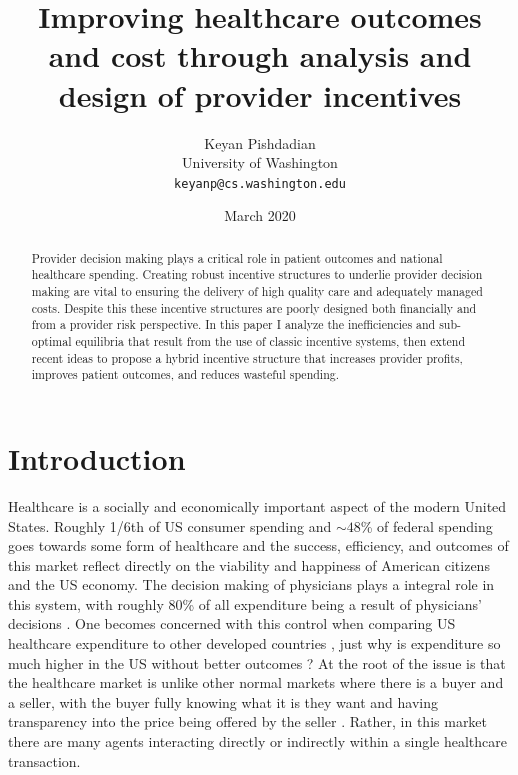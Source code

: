 \documentclass{article}
\begin{document}
\title{Improving healthcare outcomes and cost through analysis and design of provider incentives}
\author{Keyan Pishdadian\\University of Washington\\\texttt{keyanp@cs.washington.edu}}
\date{March 2020}

\maketitle

\begin{abstract}
Provider decision making plays a critical role in patient outcomes and national healthcare spending. Creating robust incentive structures to underlie provider decision making are vital to ensuring the delivery of high quality care and adequately managed costs. Despite this these incentive structures are poorly designed both financially and from a provider risk perspective. In this paper I analyze the inefficiencies and sub-optimal equilibria that result from the use of classic incentive systems, then extend recent ideas to propose a hybrid incentive structure that increases provider profits, improves patient outcomes, and reduces wasteful spending.
\end{abstract}

\section{Introduction}
Healthcare is a socially and economically important aspect of the modern United States. Roughly 1/6th of US consumer spending \cite{econharvard} and ${\sim}48$\% of federal spending \cite{federalspend} goes towards some form of healthcare and the success, efficiency, and outcomes of this market reflect directly on the viability and happiness of American citizens and the US economy. The decision making of physicians plays a integral role in this system, with roughly 80\% of all expenditure being a result of physicians' decisions \cite{trust}. One becomes concerned with this control when comparing US healthcare expenditure to other developed countries \cite{econharvard}, just why is expenditure so much higher in the US without better outcomes \cite{acoecon}? At the root of the issue is that the healthcare market is unlike other normal markets where there is a buyer and a seller, with the buyer fully knowing what it is they want and having transparency into the price being offered by the seller \cite{msdt}. Rather, in this market there are many agents interacting directly or indirectly within a single healthcare transaction.
\end{document}
